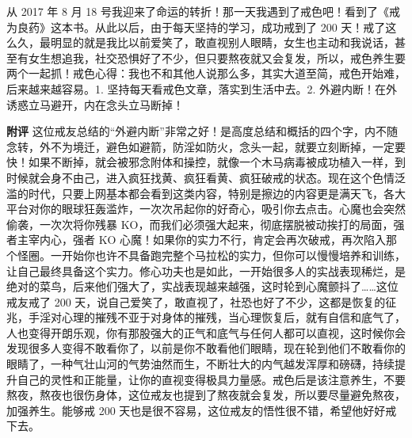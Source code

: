 \begin{case}
    从 2017 年 8 月 18 号我迎来了命运的转折！那一天我遇到了戒色吧！看到了《戒为良药》这本书。从此以后，由于每天坚持的学习，成功戒到了 200 天！戒了这么久，最明显的就是我比以前爱笑了，敢直视别人眼睛，女生也主动和我说话，甚至有女生想追我，社交恐惧好了不少，但只要熬夜就又会复发，所以，戒色养生要两个一起抓！戒色心得：我也不和其他人说那么多，其实大道至简，戒色开始难，后来越来越容易。1. 坚持每天看戒色文章，落实到生活中去。2. 外避内断！在外诱惑立马避开，内在念头立马断掉！

    \textbf{附评} 这位戒友总结的“外避内断”非常之好！是高度总结和概括的四个字，内不随念转，外不为境迁，避色如避箭，防淫如防火，念头一起，就要立刻断掉，一定要快！如果不断掉，就会被邪念附体和操控，就像一个木马病毒被成功植入一样，到时候就会身不由己，进入疯狂找黄、疯狂看黄、疯狂破戒的状态。现在这个色情泛滥的时代，只要上网基本都会看到这类内容，特别是擦边的内容更是满天飞，各大平台对你的眼球狂轰滥炸，一次次吊起你的好奇心，吸引你去点击。心魔也会突然偷袭，一次次将你残暴 KO，而我们必须强大起来，彻底摆脱被动挨打的局面，强者主宰内心，强者 KO 心魔！如果你的实力不行，肯定会再次破戒，再次陷入那个怪圈。一开始你也许不具备跑完整个马拉松的实力，但你可以慢慢培养和训练，让自己最终具备这个实力。修心功夫也是如此，一开始很多人的实战表现稀烂，是绝对的菜鸟，后来他们强大了，实战表现越来越强，这时轮到心魔颤抖了……这位戒友戒了 200 天，说自己爱笑了，敢直视了，社恐也好了不少，这都是恢复的征兆，手淫对心理的摧残不亚于对身体的摧残，当心理恢复后，就有自信和底气了，人也变得开朗乐观，你有那股强大的正气和底气与任何人都可以直视，这时候你会发现很多人变得不敢看你了，以前是你不敢看他们眼睛，现在轮到他们不敢看你的眼睛了，一种气壮山河的气势油然而生，不断壮大的内气越发浑厚和磅礴，持续提升自己的灵性和正能量，让你的直视变得极具力量感。戒色后是该注意养生，不要熬夜，熬夜也很伤身体，这位戒友也提到了熬夜就会复发，所以要尽量避免熬夜，加强养生。能够戒 200 天也是很不容易，这位戒友的悟性很不错，希望他好好戒下去。
\end{case}

